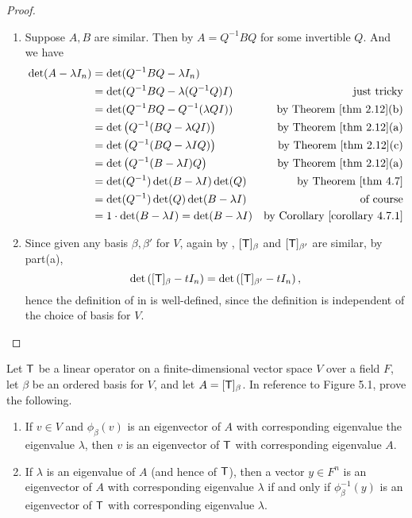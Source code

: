 \begin{proof} \ 

\begin{enumerate}
\item
Suppose \(A, B\) are similar.
Then by  \(A = Q^{-1} B Q\) for some invertible \(Q\).
And we have
\begin{align*}
    \det(A - \lambda I_n) & = \det(Q^{-1} B Q - \lambda I_n) \\
        & = \det(Q^{-1} B Q - \lambda (Q^{-1} Q) I) & \text{just tricky} \\
        & = \det(Q^{-1} B Q - Q^{-1} (\lambda Q I)) & \text{by \THM{2.12}(b)} \\
        & = \det \left( Q^{-1} (BQ - \lambda Q I) \right) & \text{by \THM{2.12}(a)} \\
        & = \det \left( Q^{-1} (BQ - \lambda I Q ) \right) & \text{by \THM{2.12}(c)} \\
        & = \det \left( Q^{-1} (B - \lambda I ) Q \right) & \text{by \THM{2.12}(a)} \\
        & = \det ( Q^{-1} ) \det (B - \lambda I ) \det (Q) & \text{by \THM{4.7}} \\
        & = \det ( Q^{-1} ) \det (Q) \det (B - \lambda I) & \text{of course} \\
        & = 1 \cdot \det(B - \lambda I) = \det(B - \lambda I) & \text{by \CORO{4.7.1}}
\end{align*}

\item
Since given any basis \(\beta, \beta'\) for \(V\), again by , \([\textsf{T}]_{\beta}\) and \([\textsf{T}]_{\beta'}\) are similar, by part(a),
\[
    \det \left( [\textsf{T}]_{\beta} - t I_n \right) = \det \left( [\textsf{T}]_{\beta'} - t I_n \right),
\]
hence the definition of \CPOLY{} in  is well-defined, since the definition is independent of the choice of basis for \(V\).
\end{enumerate}
\end{proof}

\begin{exercise} \label{exercise 5.1.14}
Let \(\textsf{T}\) be a linear operator on a finite-dimensional vector space \(V\) over a field \(F\), let \(\beta\) be an ordered basis for \(V\), and let \(A = [\textsf{T}]_{\beta}\).
In reference to Figure 5.1, prove the following.
\begin{enumerate}
\item If \(v \in V\) and \(\phi_{\beta}(v)\) is an eigenvector of \(A\) with corresponding eigenvalue the eigenvalue \(\lambda\), then \(v\) is an eigenvector of \(\textsf{T}\) with corresponding eigenvalue \(A\).
\item If \(\lambda\) is an eigenvalue of \(A\) (and hence of \(\textsf{T}\)), then a vector \(y \in F^n\) is an eigenvector of \(A\) with corresponding eigenvalue \(\lambda\) if and only if \(\phi_{\beta}^{-1}(y)\) is an eigenvector of \(\textsf{T}\) with corresponding eigenvalue \(\lambda\).
\end{enumerate}
\end{exercise}

